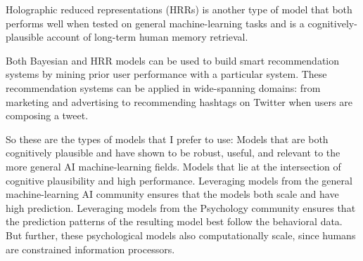 Holographic reduced representations (HRRs) is another type of model that both performs well when tested on general machine-learning tasks
and is a cognitively-plausible account of long-term human memory retrieval.

Both Bayesian and HRR models can be used to build smart recommendation systems by mining prior user performance with a particular system.
These recommendation systems can be applied in wide-spanning domains: from marketing and advertising to recommending hashtags on Twitter when users are composing a tweet.

So these are the types of models that I prefer to use:
Models that are both cognitively plausible and have shown to be robust, useful, and relevant to the more general AI machine-learning fields.
Models that lie at the intersection of cognitive plausibility and high performance.
Leveraging models from the general machine-learning AI community ensures that the models both scale and have high prediction.
Leveraging models from the Psychology community ensures that the prediction patterns of the resulting model best follow the behavioral data.
But further, these psychological models also computationally scale, since humans are constrained information processors.
